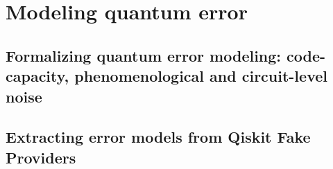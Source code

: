 \chapter{Modeling quantum error}

\section{Formalizing quantum error modeling: code-capacity, phenomenological and circuit-level noise}

\section{Extracting error models from Qiskit Fake Providers}
